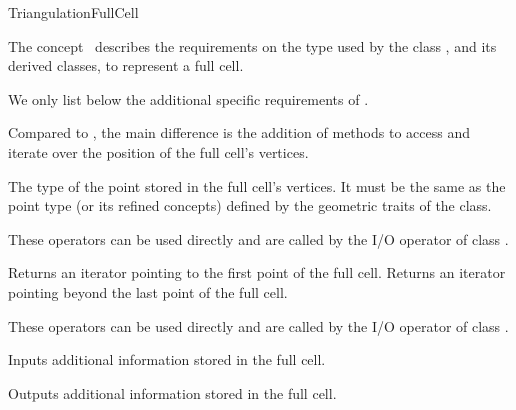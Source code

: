 \begin{ccRefConcept}{TriangulationFullCell}

\ccDefinition

The concept \ccRefName\ describes the requirements on the type used by the
class , and its derived classes, to
represent a full cell.

\ccRefines


We only list below the additional specific requirements of \ccRefName.

Compared to , the main difference is the addition of
methods to access and iterate over the position of the full cell's
vertices.

\ccHasModels


\ccTypes

%
{The type of the point stored in the full cell's vertices. It must be the same
as the point type  (or its refined concepts)
defined by the geometric traits of the 
class.}



\ccOperations
These operators can be used directly and are called by the I/O
operator of class .

{Returns an iterator pointing to the first point of the full cell.}
\ccGlue
{}
{Returns an iterator pointing beyond the last point of the full cell.}


These operators can be used directly and are called by the I/O
operator of class .

%
{Inputs additional  information stored in the full cell.}

%
{Outputs additional  information stored in the full cell.}



\ccSeeAlso

\\
\\

\end{ccRefConcept}
